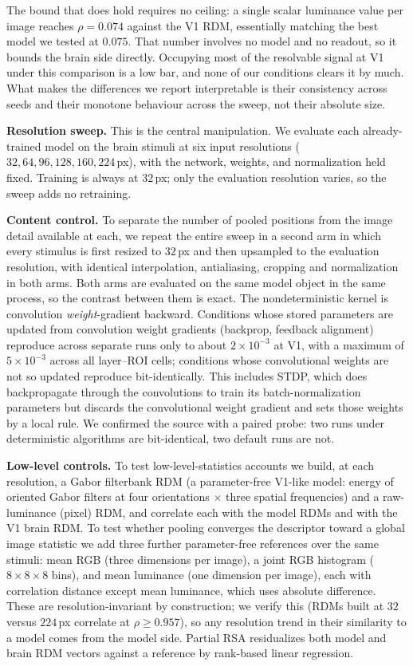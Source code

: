 \documentclass[10pt,twocolumn]{article}
\begin{document}
The bound that does hold requires no ceiling: a single scalar luminance value per image reaches $\rho = 0.074$ against the V1 RDM, essentially matching the best model we tested at $0.075$. That number involves no model and no readout, so it bounds the brain side directly. Occupying most of the resolvable signal at V1 under this comparison is a low bar, and none of our conditions clears it by much. What makes the differences we report interpretable is their consistency across seeds and their monotone behaviour across the sweep, not their absolute size.

\textbf{Resolution sweep.} This is the central manipulation. We evaluate each already-trained model on the brain stimuli at six input resolutions ($32, 64, 96, 128, 160, 224$\,px), with the network, weights, and normalization held fixed. Training is always at $32$\,px; only the evaluation resolution varies, so the sweep adds no retraining.

\textbf{Content control.} To separate the number of pooled positions from the image detail available at each, we repeat the entire sweep in a second arm in which every stimulus is first resized to $32$\,px and then upsampled to the evaluation resolution, with identical interpolation, antialiasing, cropping and normalization in both arms. Both arms are evaluated on the same model object in the same process, so the contrast between them is exact. The nondeterministic kernel is convolution \emph{weight}-gradient backward. Conditions whose stored parameters are updated from convolution weight gradients (backprop, feedback alignment) reproduce across separate runs only to about $2\times10^{-3}$ at V1, with a maximum of $5\times10^{-3}$ across all layer--ROI cells; conditions whose convolutional weights are not so updated reproduce bit-identically. This includes STDP, which does backpropagate through the convolutions to train its batch-normalization parameters but discards the convolutional weight gradient and sets those weights by a local rule. We confirmed the source with a paired probe: two runs under deterministic algorithms are bit-identical, two default runs are not.

\textbf{Low-level controls.} To test low-level-statistics accounts we build, at each resolution, a Gabor filterbank RDM (a parameter-free V1-like model: energy of oriented Gabor filters at four orientations $\times$ three spatial frequencies) and a raw-luminance (pixel) RDM, and correlate each with the model RDMs and with the V1 brain RDM. To test whether pooling converges the descriptor toward a global image statistic we add three further parameter-free references over the same stimuli: mean RGB (three dimensions per image), a joint RGB histogram ($8\times8\times8$ bins), and mean luminance (one dimension per image), each with correlation distance except mean luminance, which uses absolute difference. These are resolution-invariant by construction; we verify this (RDMs built at $32$ versus $224$\,px correlate at $\rho \geq 0.957$), so any resolution trend in their similarity to a model comes from the model side. Partial RSA residualizes both model and brain RDM vectors against a reference by rank-based linear regression.
\end{document}
